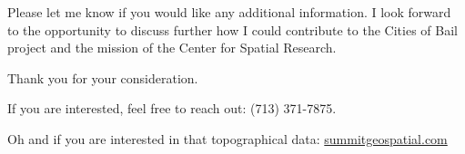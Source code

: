 \documentclass[letterpaper,10pt,colorlinks,linkcolor=cyan]{moderncv}
\begin{document}
Please let me know if you would like any additional information. I look forward to the opportunity to discuss further how I could contribute to the Cities of Bail project and the mission of the Center for Spatial Research.

Thank you for your consideration.

If you are interested, feel free to reach out: (713) 371-7875.

Oh and if you are interested in that topographical data:
\href{http://summitgeospatial.com}{summitgeospatial.com}

\end{document}
